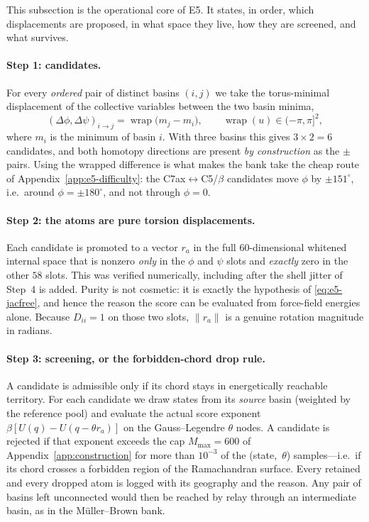 \documentclass[11pt]{article}
\begin{document}
This subsection is the operational core of E5.  It states, in order, which
displacements are proposed, in what space they live, how they are screened, and
what survives.

\paragraph{Step 1: candidates.}
For every \emph{ordered} pair of distinct basins $(i,j)$ we take the
torus-minimal displacement of the collective variables between the two basin
minima,
\begin{equation}
 (\Delta\phi,\Delta\psi)_{i\to j}
 =\operatorname{wrap}\bigl(m_j-m_i\bigr),
 \qquad
 \operatorname{wrap}(u)\in(-\pi,\pi]^2 ,
\end{equation}
where $m_i$ is the minimum of basin $i$.  With three basins this gives
$3\times2=6$ candidates, and both homotopy directions are present \emph{by
construction} as the $\pm$ pairs.  Using the wrapped difference is what makes
the bank take the cheap route of Appendix~\ref{app:e5-difficulty}: the
C7ax$\leftrightarrow$C5/$\beta$ candidates move $\phi$ by $\pm151^\circ$,
i.e.\ around $\phi=\pm180^\circ$, and not through $\phi=0$.

\paragraph{Step 2: the atoms are pure torsion displacements.}
Each candidate is promoted to a vector $r_a$ in the full $60$-dimensional
whitened internal space that is nonzero \emph{only} in the $\phi$ and $\psi$
slots and \emph{exactly} zero in the other $58$ slots.  This was verified
numerically, including after the shell jitter of Step~4 is added.  Purity is
not cosmetic: it is exactly the hypothesis of \eqref{eq:e5-jacfree}, and hence
the reason the score can be evaluated from force-field energies alone.  Because
$D_{ii}=1$ on those two slots, $\lVert r_a\rVert$ is a genuine rotation
magnitude in radians.

\paragraph{Step 3: screening, or the forbidden-chord drop rule.}
A candidate is admissible only if its chord stays in energetically reachable
territory.  For each candidate we draw states from its \emph{source} basin
(weighted by the reference pool) and evaluate the actual score exponent
$\beta[U(q)-U(q-\theta r_a)]$ on the Gauss--Legendre $\theta$ nodes.  A
candidate is rejected if that exponent exceeds the cap $M_{\max}=600$ of
Appendix~\ref{app:construction} for more than $10^{-3}$ of the
(state,~$\theta$) samples---i.e.\ if its chord crosses a forbidden region of
the Ramachandran surface.  Every retained and every dropped atom is logged with
its geography and the reason.  Any pair of basins left unconnected would then
be reached by relay through an intermediate basin, as in the M\"uller--Brown
bank.
\end{document}
